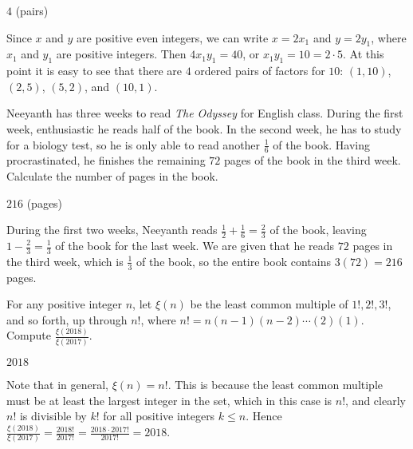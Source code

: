 \documentclass[11pt]{article}
\begin{document}
\begin{answer}
$\boxed{4}$ (pairs)
\end{answer}

\begin{solution}
Since $x$ and $y$ are positive even integers, we can write $x = 2x_1$ and $y = 2y_1$, where 
$x_1$ and $y_1$ are positive integers. Then $4x_1y_1 = 40$, or $x_1y_1 = 10 = 2 \cdot 5$. 
At this point it is easy to see that there are $\boxed{4}$ ordered pairs of factors for $10$:
$(1, 10)$, $(2, 5)$, $(5, 2)$, and $(10, 1)$.
\end{solution}


\begin{problem}
Neeyanth has three weeks to read \textit{The Odyssey} for English class. During the first week, 
enthusiastic he reads half of the book. In the second week, he has to study for a biology test, 
so he is only able to read another $\frac{1}{6}$ of the book. Having procrastinated, 
he finishes the remaining $72$ pages of the book in the third week. Calculate the number of pages in the book.
\end{problem}

\begin{answer}
$\boxed{216}$ (pages)
\end{answer}

\begin{solution}
During the first two weeks, Neeyanth reads $\frac{1}{2} + \frac{1}{6} = \frac{2}{3}$ of the book, leaving
$1 - \frac{2}{3} = \frac{1}{3}$ of the book for the last week. We are given that he reads $72$ pages in
the third week, which is $\frac{1}{3}$ of the book, so the entire book contains $3(72) = \boxed{216}$ pages.
\end{solution}


\begin{problem}%
For any positive integer $n$, let $\xi(n)$ be the least common multiple of $1!, 2!, 3!$, and so
forth, up through $n!$, where $n! = n(n-1)(n-2) \cdots (2)(1)$. Compute $\frac{\xi(2018)}{\xi(2017)}$.
\end{problem}

\begin{answer}
$\boxed{2018}$
\end{answer}

\begin{solution}
Note that in general, $\xi(n) = n!$. This is because the least common multiple must be at least
the largest integer in the set, which in this case is $n!$, and clearly $n!$ is divisible
by $k!$ for all positive integers $k \le n$. Hence $\frac{\xi(2018)}{\xi(2017)} =
\frac{2018!}{2017!} = \frac{2018 \cdot 2017!}{2017!} = \boxed{2018}$.
\end{solution}
\end{document}
